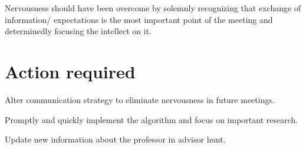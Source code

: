 \documentclass{article}
\begin{document}
Nervousness should have been overcome by solemnly recognizing that exchange of information/ expectations is the most important point of the meeting and determinedly focusing the intellect on it.

\section{Action required}
Alter communication strategy to eliminate nervousness in future meetings.

Promptly and quickly implement the algorithm and focus on important research.

Update new information about the professor in advisor hunt.
\end{document}
